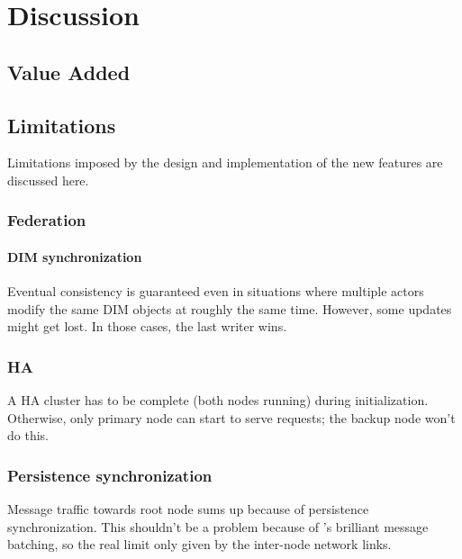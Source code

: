 \chapter{Discussion}

\section{Value Added}

\section{Limitations}
Limitations imposed by the design and implementation of the new features are
discussed here.

\subsection{Federation}
\subsubsection{DIM synchronization}
Eventual consistency is guaranteed even in situations where multiple actors
modify the same DIM objects at roughly the same time. However, some updates
might get lost. In those cases, the last writer wins.

\subsection{HA}
A HA cluster has to be complete (both nodes running) during initialization.
Otherwise, only primary node can start to serve requests; the backup node won't
do this.

\subsection{Persistence synchronization}
Message traffic towards root node sums up because of persistence
synchronization. This shouldn't be a problem because of \zmq's brilliant
message batching, so the real limit only given by the inter-node network links.

